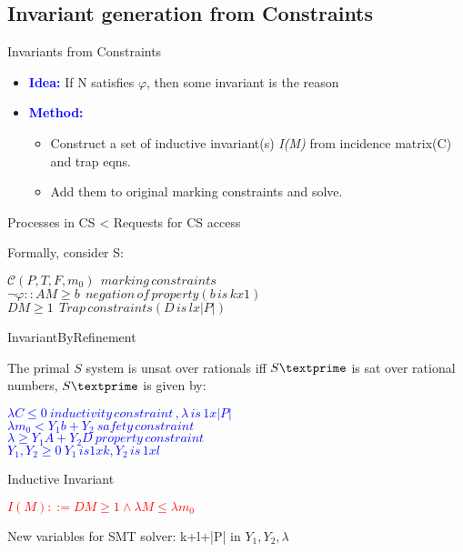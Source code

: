 \documentclass{beamer}
\begin{document}
\subsection{Invariant generation from Constraints}

\begin{frame}{Invariants from Constraints}
\begin{itemize}
  \item \textcolor{blue}{\textbf{Idea:}} If N satisfies $\varphi$, then some invariant is the reason
  \item \textcolor{blue}{\textbf{Method:}} 
  \begin{itemize}
    \item Construct a set of inductive invariant(s) \textit{I(M)} from incidence matrix(C) and trap eqns.
    \item Add them to original marking constraints and solve.
  \end{itemize}
\end{itemize}
\begin{example}
  \begin{center}
  Processes in CS < Requests for CS access
  \end{center}
\end{example}
Formally, consider S:\\
\begin{center}
$\mathcal{C}(P,T,F,m_0) \:\: marking\, constraints$\\
$\neg\varphi :: AM \geq b \:\: negation\,of\,property (b\,is\,kx1)$\\
$DM \geq 1 \:\:     Trap\,constraints(D\,is\,lx|P|)$
\end{center}

\end{frame}


\begin{frame}{InvariantByRefinement}
\begin{Theorem}
  The primal $S$ system is unsat over rationals iff $S\textprime$ is sat over rational numbers, $S\textprime$ is given by:
\begin{center}
  \textcolor{blue}{
$  \lambda C \leq 0   \: inductivity\,constraint\,,\lambda\,is\,1x|P|$\\
$ \lambda m_0 < Y_1b+Y_2 \: safety\,constraint$\\
$  \lambda \geq Y_1A + Y_2D \: property\,constraint$\\
$ Y_1,Y_2\geq 0 \: Y_1\,is1xk, Y_2\,is\,1xl $}
\end{center}
  
\end{Theorem}
\begin{block}{Inductive Invariant}
  \begin{center}
    \textcolor{red}{$I(M)::= DM\geq 1 \land \lambda M \leq \lambda m_0$}
  \end{center}
\end{block}
New variables for SMT solver: k+l+|P| in $Y_1, Y_2, \lambda$
\end{frame}
\end{document}
